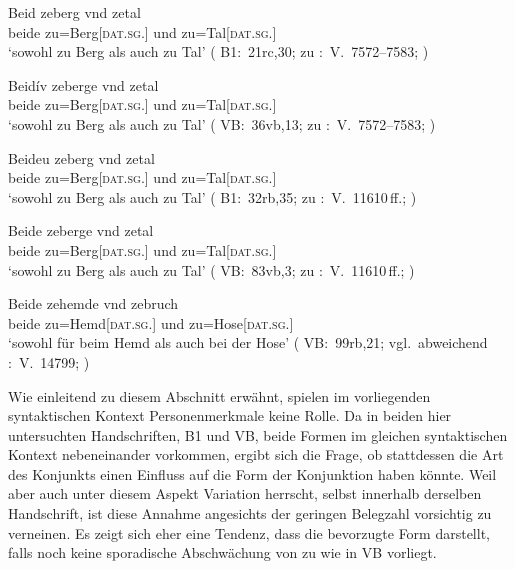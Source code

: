 \begin{exe}
\ex \label{ex:syntintvar2}
\begin{xlist}
	\ex \label{ex:syntintvar2_1}
		\gll Beid zeberg vnd zetal \\
			beide zu=Berg[\textsc{dat.sg.\MascI}] und zu=Tal[\textsc{dat.sg.\NeutI}] \\
		\trans `sowohl zu Berg als auch zu Tal'
			(%
				B1:~21rc,30; zu
				\KC:~V.~7572--7583;
				\cite[220]{schroeder1895}%
			)

	\ex \label{ex:syntintvar2_3}
		\gll Beidív zeberge vnd zetal \\
			beide zu=Berg[\textsc{dat.sg.\MascI}] und zu=Tal[\textsc{dat.sg.\NeutI}] \\
		\trans `sowohl zu Berg als auch zu Tal'
			(%
				VB:~36vb,13; zu
				\KC:~V.~7572--7583;
				\cite[220]{schroeder1895}%
			)
\end{xlist}

\ex \label{ex:syntintvar5}
\begin{xlist}
	\ex \label{ex:syntintvar2_2}
		\gll Beideu zeberg vnd zetal \\
			beide zu=Berg[\textsc{dat.sg.\MascI}] und zu=Tal[\textsc{dat.sg.\NeutI}] \\
		\trans `sowohl zu Berg als auch zu Tal'
			(%
				B1:~32rb,35; zu
				\KC:~V.~11610\,ff.;
				\cite[293]{schroeder1895}%
			)

	\ex \label{ex:syntintvar2_4}
		\gll Beide zeberge vnd zetal \\
			beide zu=Berg[\textsc{dat.sg.\MascI}] und zu=Tal[\textsc{dat.sg.\NeutI}] \\
		\trans `sowohl zu Berg als auch zu Tal'
			(%
				VB:~83vb,3; zu
				\KC:~V.~11610\,ff.;
				\cite[293]{schroeder1895}%
			)
\end{xlist}

\ex \label{ex:syntintvar4}
	\gll Beide zehemde vnd zebruch \\
		beide zu=Hemd[\textsc{dat.sg.\NeutI}] und
			zu=Hose[\textsc{dat.sg.\FemI}] \\
	\trans `sowohl für beim Hemd als auch bei der Hose'
		(%
			VB:~99rb,21; vgl.~abweichend
			\KC:~V.~14799;
			\cite[349]{schroeder1895}%
		)
\end{exe}

Wie einleitend zu diesem Abschnitt erwähnt, spielen im vorliegenden
syntaktischen Kontext Personenmerkmale keine Rolle. Da in
beiden hier untersuchten Handschriften, B1 und VB, beide Formen im gleichen
syntaktischen Kontext nebeneinander vorkommen, ergibt sich die Frage, ob
stattdessen die Art des Konjunkts einen Einfluss auf die Form der Konjunktion
haben könnte. Weil aber auch unter diesem Aspekt Variation herrscht, selbst
innerhalb derselben Handschrift, ist diese Annahme angesichts der geringen
Belegzahl vorsichtig zu verneinen. Es zeigt sich eher eine Tendenz, dass
 die bevorzugte Form darstellt, falls noch keine sporadische
Abschwächung von  zu  wie in VB vorliegt.

